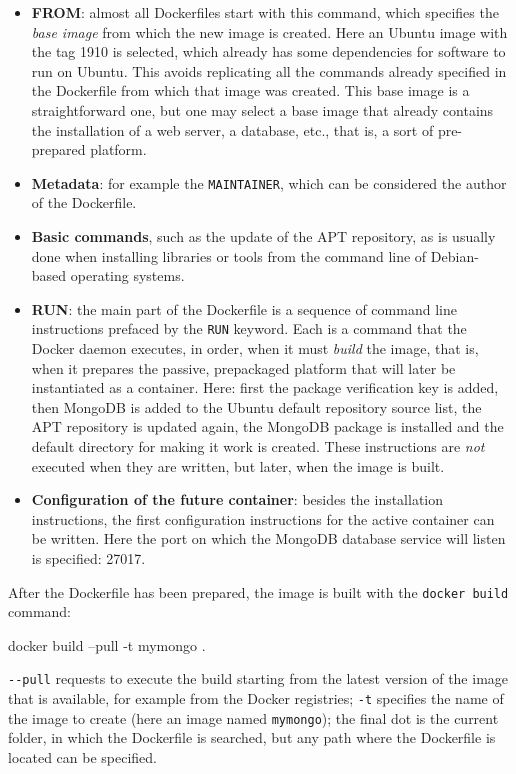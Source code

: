 \begin{itemize}
\item \textbf{FROM}: almost all Dockerfiles start with this command, which specifies the \emph{base image} from which the new image is created. Here an Ubuntu image with the tag 1910 is selected, which already has some dependencies for software to run on Ubuntu. This avoids replicating all the commands already specified in the Dockerfile from which that image was created. This base image is a straightforward one, but one may select a base image that already contains the installation of a web server, a database, etc., that is, a sort of pre-prepared platform.
\item \textbf{Metadata}: for example the \texttt{MAINTAINER}, which can be considered the author of the Dockerfile.
\item \textbf{Basic commands}, such as the update of the APT repository, as is usually done when installing libraries or tools from the command line of Debian-based operating systems.
\item \textbf{RUN}: the main part of the Dockerfile is a sequence of command line instructions prefaced by the \texttt{RUN} keyword. Each is a command that the Docker daemon executes, in order, when it must \emph{build} the image, that is, when it prepares the passive, prepackaged platform that will later be instantiated as a container. Here: first the package verification key is added, then MongoDB is added to the Ubuntu default repository source list, the APT repository is updated again, the MongoDB package is installed and the default directory for making it work is created. These instructions are \emph{not} executed when they are written, but later, when the image is built.
\item \textbf{Configuration of the future container}: besides the installation instructions, the first configuration instructions for the active container can be written. Here the port on which the MongoDB database service will listen is specified: 27017.
\end{itemize}

After the Dockerfile has been prepared, the image is built with the \texttt{docker build} command:

\begin{codeblock}
docker build --pull -t mymongo .
\end{codeblock}

\texttt{-{}-pull} requests to execute the build starting from the latest version of the image that is available, for example from the Docker registries; \texttt{-t} specifies the name of the image to create (here an image named \texttt{mymongo}); the final dot is the current folder, in which the Dockerfile is searched, but any path where the Dockerfile is located can be specified.

